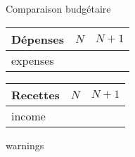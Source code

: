 \documentclass[10 pt]{report}
\begin{document}
\centerline{\Huge Comparaison budgétaire}

\begin{minipage}[t]{.47\textwidth}
  \vspace{0pt}
  \begin{tabu} to \linewidth {|X|r|r|}
    \hline
    Dépenses & $N$ & $N+1$ \\
    \hline
    \hline
    {{expenses}}
    \hline
  \end{tabu}
  \vfill
\end{minipage}
\begin{minipage}[t]{.47\textwidth}
  \vspace{0pt}
  \begin{tabu} to \linewidth {|X|r|r|}
    \hline
    Recettes & $N$ & $N+1$ \\
    \hline
    \hline
    {{income}}
    \hline
  \end{tabu}
  \vfill
\end{minipage}

{{warnings}}
\end{document}
